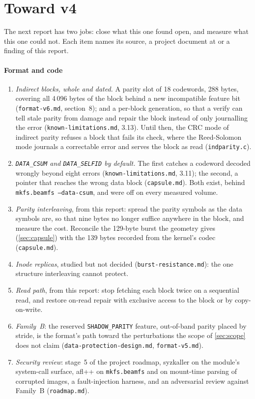\section{Toward v4}\label{sec:v4}

The next report has two jobs: close what this one found open, and
measure what this one could not. Each item names its source, a project
document at \texttt{\commitBeamfs} or a finding of this report.

\paragraph*{Format and code}
\begin{enumerate}
\item \emph{Indirect blocks, whole and dated.} A parity slot of 18
  codewords, 288 bytes, covering all 4\,096 bytes of the block behind a
  new incompatible feature bit (\texttt{format-v6.md}, section~8); and a
  per-block generation, so that a verify can tell stale parity from
  damage and repair the block instead of only journalling the error
  (\texttt{known-limitations.md}, 3.13). Until then, the CRC mode of
  indirect parity refuses a block that fails its check, where the
  Reed-Solomon mode journals a correctable error and serves the block as
  read (\texttt{indparity.c}).
\item \emph{\texttt{DATA\_CSUM} and \texttt{DATA\_SELFID} by default.}
  The first catches a codeword decoded wrongly beyond eight errors
  (\texttt{known-limitations.md}, 3.11); the second, a pointer that
  reaches the wrong data block (\texttt{capsule.md}). Both exist, behind
  \texttt{mkfs.beamfs --data-csum}, and were off on every measured
  volume.
\item \emph{Parity interleaving}, from this report: spread the parity
  symbols as the data symbols are, so that nine bytes no longer suffice
  anywhere in the block, and measure the cost. Reconcile the 129-byte
  burst the geometry gives (\cref{sec:capsule}) with the 139 bytes
  recorded from the kernel's codec (\texttt{capsule.md}).
\item \emph{Inode replicas}, studied but not decided
  (\texttt{burst-resistance.md}): the one structure interleaving cannot
  protect.
\item \emph{Read path}, from this report: stop fetching each block twice
  on a sequential read, and restore on-read repair with exclusive access
  to the block or by copy-on-write.
\item \emph{Family~B}: the reserved \texttt{SHADOW\_PARITY} feature,
  out-of-band parity placed by stride, is the format's path toward the
  perturbations the scope of \cref{sec:scope} does not claim
  (\texttt{data-protection-design.md}, \texttt{format-v5.md}).
\item \emph{Security review}: stage~5 of the project roadmap, syzkaller
  on the module's system-call surface, afl++ on \texttt{mkfs.beamfs}
  and on mount-time parsing of corrupted images, a fault-injection
  harness, and an adversarial review against Family~B
  (\texttt{roadmap.md}).
\end{enumerate}

